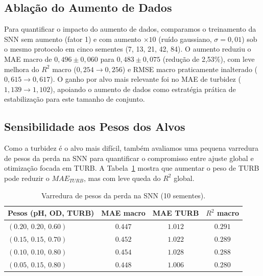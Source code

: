 \subsection{Ablação do Aumento de Dados}
Para quantificar o impacto do aumento de dados, comparamos o treinamento da SNN sem aumento (fator 1) e com aumento $\times 10$ (ruído gaussiano, \mbox{$\sigma=0,01$}) sob o mesmo protocolo em cinco sementes (7, 13, 21, 42, 84). O aumento reduziu o MAE macro de \mbox{$0,496 \pm 0,060$} para \mbox{$0,483 \pm 0,075$} (redução de 2,53\%), com leve melhora do $R^2$ macro (\mbox{$0,254 \rightarrow 0,256$}) e RMSE macro praticamente inalterado (\mbox{$0,615 \rightarrow 0,617$}). O ganho por alvo mais relevante foi no MAE de turbidez (\mbox{$1,139 \rightarrow 1,102$}), apoiando o aumento de dados como estratégia prática de estabilização para este tamanho de conjunto.

\subsection{Sensibilidade aos Pesos dos Alvos}
Como a turbidez é o alvo mais difícil, também avaliamos uma pequena varredura de pesos da perda na SNN para quantificar o compromisso entre ajuste global e otimização focada em TURB. A Tabela~\ref{tab:snn_weight_sweep_sba} mostra que aumentar o peso de TURB pode reduzir o $MAE_{TURB}$, mas com leve queda do $R^2$ global.

\begin{table}[!htbp]
\caption{Varredura de pesos da perda na SNN (10 sementes).}
\label{tab:snn_weight_sweep_sba}
\centering
\footnotesize
\setlength{\tabcolsep}{3pt}
\begin{tabular}{lccc}
\toprule
Pesos (pH, OD, TURB) & MAE macro & MAE TURB & $R^2$ macro \\
\midrule
\mbox{$(0.20,\,0.20,\,0.60)$} & $\mathbf{0.447}$ & $1.012$ & $\mathbf{0.291}$ \\
\mbox{$(0.15,\,0.15,\,0.70)$} & $0.452$ & $1.022$ & $0.289$ \\
\mbox{$(0.10,\,0.10,\,0.80)$} & $0.454$ & $1.028$ & $0.288$ \\
\mbox{$(0.05,\,0.15,\,0.80)$} & $0.448$ & $\mathbf{1.006}$ & $0.280$ \\
\bottomrule
\end{tabular}
\end{table}


